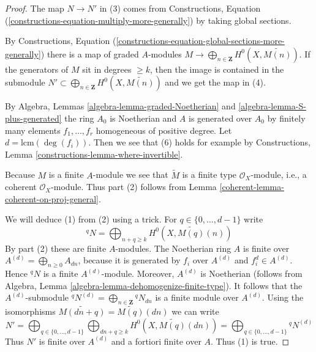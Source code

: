\begin{proof}

The map $N \to N'$ in (3) comes from
Constructions, Equation (\ref{constructions-equation-multiply-more-generally})
by taking global sections.

\medskip\noindent
By
Constructions, Equation
(\ref{constructions-equation-global-sections-more-generally})
there is a map of graded $A$-modules
$M \to \bigoplus_{n \in \mathbf{Z}} H^0(X, \widetilde{M(n)})$.
If the generators of $M$ sit in degrees $\geq k$, then the image
is contained in the submodule
$N' \subset \bigoplus_{n \in \mathbf{Z}} H^0(X, \widetilde{M(n)})$
and we get the map in (4).

\medskip\noindent
By Algebra, Lemmas \ref{algebra-lemma-graded-Noetherian} and
\ref{algebra-lemma-S-plus-generated} the ring $A_0$ is Noetherian
and $A$ is generated over $A_0$ by finitely many elements
$f_1, \ldots, f_r$ homogeneous of positive degree.
Let $d = \text{lcm}(\deg(f_i))$. Then we see that (6) holds
for example by
Constructions, Lemma \ref{constructions-lemma-where-invertible}.

\medskip\noindent
Because $M$ is a finite $A$-module we see that
$\widetilde{M}$ is a finite type $\mathcal{O}_X$-module,
i.e., a coherent $\mathcal{O}_X$-module.
Thus part (2) follows from Lemma \ref{coherent-lemma-coherent-on-proj-general}.

\medskip\noindent
We will deduce (1) from (2) using a trick. For $q \in \{0, \ldots, d - 1\}$
write
$$
{}^qN = \bigoplus\nolimits_{n + q \geq k} H^0(X, \widetilde{M(q)}(n))
$$
By part (2) these are finite $A$-modules. The Noetherian ring $A$
is finite over $A^{(d)} = \bigoplus_{n \geq 0} A_{dn}$, because
it is generated by $f_i$ over $A^{(d)}$ and $f_i^d \in A^{(d)}$.
Hence ${}^qN$ is a finite $A^{(d)}$-module.
Moreover, $A^{(d)}$ is Noetherian (follows from
Algebra, Lemma \ref{algebra-lemma-dehomogenize-finite-type}).
It follows that the $A^{(d)}$-submodule
${}^qN^{(d)} = \bigoplus_{n \in \mathbf{Z}} {}^qN_{dn}$
is a finite module over $A^{(d)}$. Using the isomorphisms
$\widetilde{M(dn + q)} = \widetilde{M(q)}(dn)$ we can write
$$
N' =
\bigoplus\nolimits_{q \in \{0, \ldots, d - 1\}}
\bigoplus\nolimits_{dn + q \geq k}
H^0(X, \widetilde{M(q)}(dn)) =
\bigoplus\nolimits_{q \in \{0, \ldots, d - 1\}} {}^qN^{(d)}
$$
Thus $N'$ is finite over $A^{(d)}$ and a fortiori finite over $A$.
Thus (1) is true.


\end{proof}
